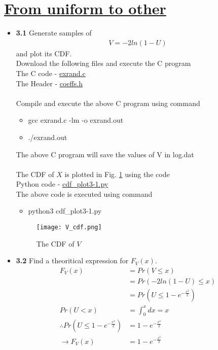 \documentclass[journal,12pt,twocolumn]{IEEEtran}
\begin{document}
\section{\underline{From uniform to other}}
\begin{itemize}
    \item \textbf{3.1} Generate samples of 
    \begin{align}
        V = -2 ln(1-U)
    \end{align}
    and plot its CDF. \\
    \solution Download the following files and execute the C program \\
    The C code - \href{https://github.com/jarpula-Bhanu/Random-numbers/blob/main/codes/exrand.c}{exrand.c} \\
    The Header - \href{https://github.com/jarpula-Bhanu/Random-numbers/blob/main/codes/coeffs.h}{coeffs.h} \\ 
    \\Compile and execute the above C program using command
    \begin{itemize}
        \item gcc exrand.c -lm -o exrand.out
        \item ./exrand.out \\
    \end{itemize} 
    The above C program will save the values of V in log.dat \\ 
    \\The CDF of $X$ is plotted in Fig. \ref{fig:V_cdf}
    using the code \\
    Python code - \href{https://github.com/jarpula-Bhanu/Random-numbers/blob/main/codes/cdf_plot3-1.py}{cdf\_plot3-1.py} \\
    The above code is executed using command
    \begin{itemize}
        \item python3 cdf\_plot3-1.py\\
    \end{itemize}

    \begin{figure}[h]
        \centering
        \texttt{[image: V\_cdf.png]}
        \caption{The CDF of $V$}
        \label{fig:V_cdf}
    \end{figure}

    \item \textbf{3.2} Find a theoritical expression for $F_V(x)$. \\
    \solution 
    \begin{align}
        F_V(x) &= Pr(V \le x)\\
        &= Pr(-2 ln(1-U) \le x) \\
        &= Pr(U \le 1-e^{-\frac{x^2}{2}}) \\
        Pr(U<x) &= \int_0^x dx = x \\
        \therefore Pr(U \le 1-e^{-\frac{x^2}{2}}) &= 1-e^{-\frac{x^2}{2}} \\
        \rightarrow F_V(x) &=1-e^{-\frac{x^2}{2}}
    \end{align}
\end{itemize}
\end{document}
